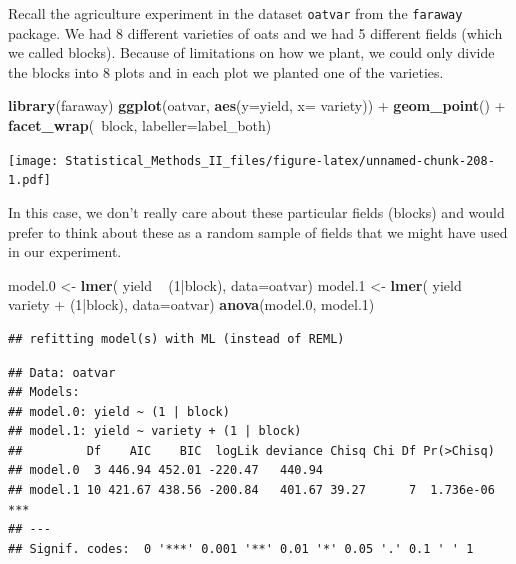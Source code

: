 \documentclass[]{book}
\newenvironment{Shaded}{\begin{snugshade}}{\end{snugshade}}
\newcommand{\KeywordTok}[1]{\textcolor[rgb]{0.13,0.29,0.53}{\textbf{{#1}}}}
\newcommand{\DataTypeTok}[1]{\textcolor[rgb]{0.13,0.29,0.53}{{#1}}}
\newcommand{\DecValTok}[1]{\textcolor[rgb]{0.00,0.00,0.81}{{#1}}}
\newcommand{\FloatTok}[1]{\textcolor[rgb]{0.00,0.00,0.81}{{#1}}}
\newcommand{\StringTok}[1]{\textcolor[rgb]{0.31,0.60,0.02}{{#1}}}
\newcommand{\NormalTok}[1]{{#1}}
\theoremstyle{definition}
\theoremstyle{definition}
\theoremstyle{remark}
\begin{document}
Recall the agriculture experiment in the dataset \texttt{oatvar} from
the \texttt{faraway} package. We had 8 different varieties of oats and
we had 5 different fields (which we called blocks). Because of
limitations on how we plant, we could only divide the blocks into 8
plots and in each plot we planted one of the varieties.

\begin{Shaded}
\begin{Highlighting}[]
\KeywordTok{library}\NormalTok{(faraway)}
\KeywordTok{ggplot}\NormalTok{(oatvar, }\KeywordTok{aes}\NormalTok{(}\DataTypeTok{y=}\NormalTok{yield, }\DataTypeTok{x=} \NormalTok{variety)) +}\StringTok{ }
\StringTok{  }\KeywordTok{geom_point}\NormalTok{() +}
\StringTok{  }\KeywordTok{facet_wrap}\NormalTok{(~block, }\DataTypeTok{labeller=}\NormalTok{label_both)}
\end{Highlighting}
\end{Shaded}

\texttt{[image: Statistical\_Methods\_II\_files/figure-latex/unnamed-chunk-208-1.pdf]}

In this case, we don't really care about these particular fields
(blocks) and would prefer to think about these as a random sample of
fields that we might have used in our experiment.

\begin{Shaded}
\begin{Highlighting}[]
\NormalTok{model}\FloatTok{.0} \NormalTok{<-}\StringTok{ }\KeywordTok{lmer}\NormalTok{( yield ~}\StringTok{ }\NormalTok{(}\DecValTok{1}\NormalTok{|block), }\DataTypeTok{data=}\NormalTok{oatvar)}
\NormalTok{model}\FloatTok{.1} \NormalTok{<-}\StringTok{ }\KeywordTok{lmer}\NormalTok{( yield ~}\StringTok{ }\NormalTok{variety +}\StringTok{ }\NormalTok{(}\DecValTok{1}\NormalTok{|block), }\DataTypeTok{data=}\NormalTok{oatvar)}
\KeywordTok{anova}\NormalTok{(model}\FloatTok{.0}\NormalTok{, model}\FloatTok{.1}\NormalTok{)}
\end{Highlighting}
\end{Shaded}

\begin{verbatim}
## refitting model(s) with ML (instead of REML)
\end{verbatim}

\begin{verbatim}
## Data: oatvar
## Models:
## model.0: yield ~ (1 | block)
## model.1: yield ~ variety + (1 | block)
##         Df    AIC    BIC  logLik deviance Chisq Chi Df Pr(>Chisq)    
## model.0  3 446.94 452.01 -220.47   440.94                            
## model.1 10 421.67 438.56 -200.84   401.67 39.27      7  1.736e-06 ***
## ---
## Signif. codes:  0 '***' 0.001 '**' 0.01 '*' 0.05 '.' 0.1 ' ' 1
\end{verbatim}
\end{document}

